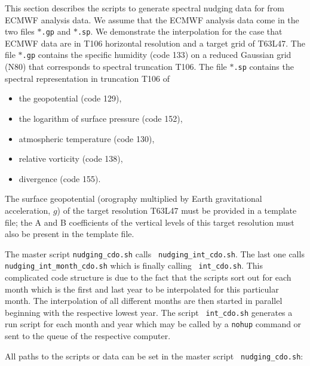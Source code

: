 \begin{appendix}
This section describes the scripts
to generate spectral
nudging data for \echam{} from ECMWF analysis data. We assume that the
ECMWF analysis data come in the two files {\tt $\ast$.gp} and
{\tt $\ast$.sp}. We demonstrate the interpolation for the case
that ECMWF data are in T106 horizontal resolution and a target grid of
T63L47. The file {\tt $\ast$.gp} contains the
specific humidity (code 133) on a reduced Gaussian grid (N80) that
corresponds to spectral truncation T106. The file {\tt $\ast$.sp}
contains the spectral representation in truncation T106 of 
\begin{itemize}
 \item the geopotential (code 129),
 \item the logarithm of surface pressure (code 152),
 \item atmospheric temperature (code 130),
 \item relative vorticity (code 138),
 \item divergence (code 155).
\end{itemize}
The surface geopotential (orography multiplied by Earth
gravitational acceleration, $g$) of the target resolution T63L47 must be
provided in a template file; the A and B coefficients of
the vertical levels of this target resolution must also be present in
the template file. 

The master script {\tt nudging\_cdo.sh} calls {\tt
  nudging\_int\_cdo.sh}. The last one calls {\tt
  nudging\_int\_month\_cdo.sh} which is finally calling {\tt
  int\_cdo.sh}. This complicated code structure is due to
the fact that the scripts sort out for each month which is the first
and last year to be interpolated for this particular month. The
interpolation of all different months are then started in parallel
beginning with the respective lowest year. The script {\tt
  int\_cdo.sh} generates a run script for each month and year which
may be called by a {\tt nohup} command or sent to the queue of the
respective computer.

All paths to the scripts or data can be set in the master script {\tt
  nudging\_cdo.sh}:

\begin{description}


\end{description}
\end{appendix}
